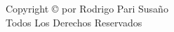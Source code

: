 \thispagestyle{empty}
\vspace*{\fill}
\begin{center}
Copyright \copyright  {} por Rodrigo Pari Susaño \\ Todos Los Derechos Reservados
\end{center}
\vspace*{\fill}

\newpage